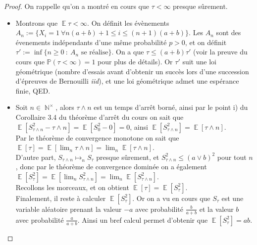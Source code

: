 \documentclass{article}
\theoremstyle{definition}
\numberwithin{equation}{section}
\DeclareMathOperator{\N}{\mathbb{N}}
\DeclareMathOperator{\E}{\mathbb{E}}
\begin{document}
\begin{proof}
On rappelle qu'on a montré en cours que $\tau<\infty$ presque sûrement.\\
\begin{itemize}
\item[\textbf{V1}] Montrons que $\E\tau<\infty$. On définit les évènements $A_n:=\{X_i=1~\forall n(a+b)+1 \leq i \leq (n+1)(a+b)\}$. Les $A_n$ sont des évenements indépendants d'une même probabilité $p>0$, et on définit $\tau' := \inf\{n\geq 0~:~A_n\text{ se réalise}\}$. On a que $\tau\leq (a+b)\tau'$ (voir la preuve du cours que $\mathbb{P}(\tau<\infty)=1$ pour plus de détails). Or $\tau'$ suit une loi géométrique (nombre d'essais avant d'obtenir un succès lors d'une succession d'épreuves de Bernouilli \textit{iid}), et une loi géométrique admet une espérance finie, QED.
\item[\textbf{V2}] Soit $n\in\N^\times$, alors $\tau\wedge n$ est un temps d'arrêt borné, ainsi par le point i) du Corollaire 3.4 du théorème d'arrêt du cours on sait que $\E[S_{\tau\wedge n}^2-\tau\wedge n] = \E[S_0^2-0]= 0$, ainsi $\E[S_{\tau\wedge n}^2]=\E[\tau\wedge n]$.\\
Par le théorème de convergence monotone on sait que $\E[\tau]=\E[\lim_n \tau\wedge n] = \lim_n\E[\tau\wedge n]$.\\
D'autre part, $S_{\tau\wedge n}\mapsto_n S_\tau$ presque sûrement, et $S_{\tau\wedge n}^2 \leq (a\vee b)^2$ pour tout $n$, donc par le théorème de convergence dominée on a également $\E[S_\tau^2]=\E[\lim_n S_{\tau\wedge n}^2]=\lim_n\E[S_{\tau\wedge n}^2]$.\\
Recollons les morceaux, et on obtient $\E[\tau]=\E[S_\tau^2]$.\\
Finalement, il reste à calculer $\E[S_\tau^2]$. Or on a vu en cours que $S_\tau$ est une variable aléatoire prenant la valeur $-a$ avec probabilité $\frac{b}{a+b}$ et la valeur $b$ avec probabilité $\frac{a}{a+b}$. Ainsi un bref calcul permet d'obtenir que $\E[S_\tau^2]=ab$.
\end{itemize}
\end{proof}
\end{document}
